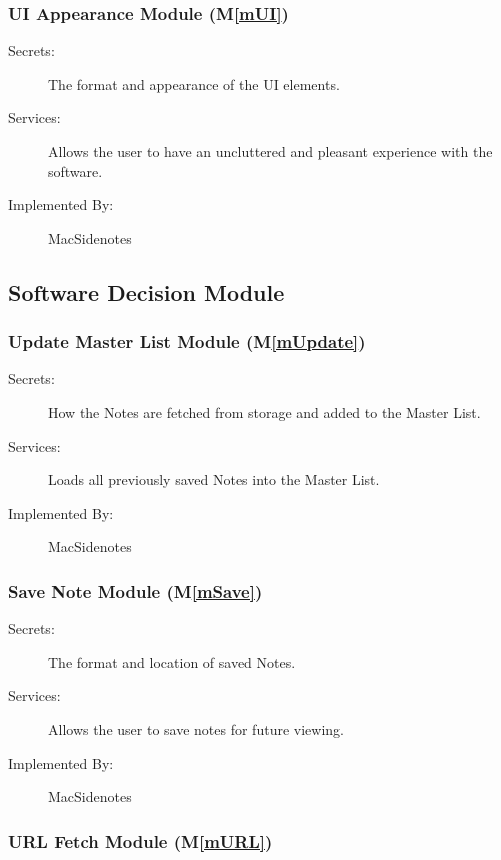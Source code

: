 \documentclass[12pt, titlepage]{article}
\newcommand{\mref}[1]{M\ref{#1}}
\begin{document}
\subsubsection{UI Appearance Module (\mref{mUI})}

\begin{description}
	\item[Secrets:]The format and appearance of the UI elements.
	\item[Services:]Allows the user to have an uncluttered and pleasant 
	experience with the software.
	\item[Implemented By:] MacSidenotes
\end{description}

\subsection{Software Decision Module}

\subsubsection{Update Master List Module (\mref{mUpdate})}

\begin{description}
	\item[Secrets:]How the Notes are fetched from storage and added to the 
	Master List.
	\item[Services:]Loads all previously saved Notes into the Master List.
	\item[Implemented By:] MacSidenotes
\end{description}

\subsubsection{Save Note Module (\mref{mSave})}

\begin{description}
	\item[Secrets:]The format and location of saved Notes.
	\item[Services:]Allows the user to save notes for future viewing.
	\item[Implemented By:] MacSidenotes
\end{description}

\subsubsection{URL Fetch Module (\mref{mURL})}
\end{document}

